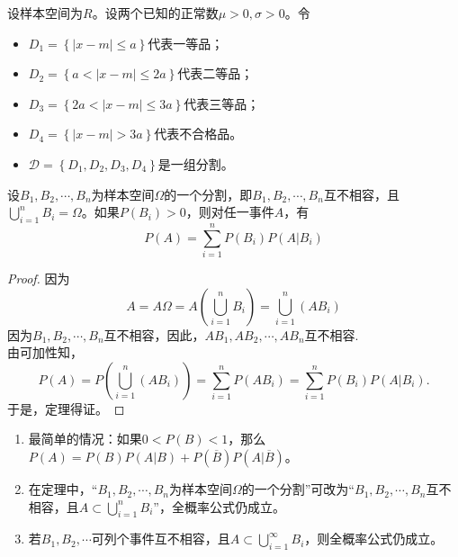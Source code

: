 \begin{example}
设样本空间为$R$。设两个已知的正常数$\mu>0,\sigma>0$。令
\begin{itemize}
    \item $D_{1}=\left \{ \left | x-m \right | \le a \right \} $代表一等品；
    \item $D_{2}=\left \{ a< \left | x-m \right | \le 2a \right \} $代表二等品；
    \item $D_{3}=\left \{ 2a< \left | x-m \right | \le 3a \right \} $代表三等品；
    \item $D_{4}=\left \{ \left | x-m \right |>  3a \right \} $代表不合格品。
    \item $\mathcal{D} =\left \{ D_{1} ,D_{2} ,D_{3} ,D_{4}  \right \} $是一组分割。
\end{itemize}
\end{example}


\begin{theorem}[全概率公式] \label{thm:total_probability_theorem} 
设$B_{1},B_{2},\cdots,B_{n}$为样本空间$\Omega$的一个分割，即$B_{1},B_{2},\cdots,B_{n}$互不相容，且$\bigcup_{i=1}^{n} B_{i}=\Omega $。如果$P(B_{i})>0$，则对任一事件$A$，有$$P(A)=\sum_{i=1}^{n} P(B_{i})P(A|B_{i})$$
\end{theorem}

\begin{proof}
因为$$A=A\Omega =A\left(\bigcup_{i=1}^{n} B_{i} \right)=\bigcup_{i=1}^{n}\left(AB_{i} \right)$$
因为$B_{1},B_{2},\cdots,B_{n}$互不相容，因此，$AB_{1},AB_{2},\cdots,AB_{n}$互不相容.\\
由可加性知，$$P(A)=P\left(\bigcup_{i=1}^{n}\left(AB_{i} \right)\right)=\sum_{i=1}^{n} P\left(AB_{i} \right)=\sum_{i=1}^{n}P(B_{i} )P(A|B_{i} ).$$
于是，定理得证。
\end{proof}

\begin{remark}
\begin{enumerate}
    \item 最简单的情况：如果$0<P(B)<1$，那么$P(A)=P(B)P(A|B)+P(\overline{B} )P(A|\overline{B} )$。
    \item 在定理中，“$B_{1},B_{2},\cdots,B_{n}$为样本空间$\Omega$的一个分割”可改为“$B_{1},B_{2},\cdots,B_{n}$互不相容，且$A\subset \bigcup_{i=1}^{n} B_{i} $”，全概率公式仍成立。
    \item 若$B_{1},B_{2},\cdots$可列个事件互不相容，且$A\subset \bigcup_{i=1}^{\infty} B_{i} $，则全概率公式仍成立。
\end{enumerate}
\end{remark}

